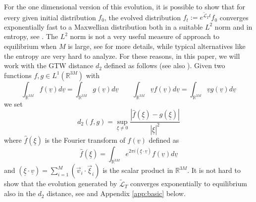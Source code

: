 \documentclass{article}
\newcommand \ul[1]{\underline{#1}}
\renewcommand\v[1]{\vec{#1}}
\newcommand\uxi{{\underline \xi}}
\begin{document}
For the one dimensional version of this evolution, it is possible to show that for every given initial distribution
$f_0$, the evolved distribution $f_t:=e^{\widetilde{\mathcal L}_T t}f_0$ converges exponentially fast to a Maxwellian
distribution both in a suitable $L^2$ norm and in entropy, see \cite{BLV}. The $L^2$ norm is not a very useful measure
of approach to equilibrium when $M$ is large, see \cite{BLV} for more details, while typical alternatives like the
entropy are very hard to analyze. For these reasons, in this paper, we will work with the GTW distance $d_2$ defined as
follows (see also \cite{GTW}). Given two functions $f,g\in L^1(\mathds{R}^{3M})$ with
\[
\int_{\mathds{R}^{3M}} f(\underline v)d\underline v=\int_{\mathds{R}^{3M}} g(\underline v)d\underline v \qquad
\int_{\mathds{R}^{3M}} \underline v f(\underline v)d\underline v= 
\int _{\mathds{R}^{3M}}\underline v g(\underline v)d\underline v
\]
we set
\begin{equation}\label{eq:d2}
 d_2(f,g)=\sup_{\underline \xi\not=0}\frac {|\hat f(\underline \xi)-\hat g(\underline \xi)|}{|\underline \xi|^2}
\end{equation}
where $\hat f(\uxi)$ is the Fourier transform of $f(\underline v)$ defined as
\[
 \hat f(\ul\xi)=\int_{\mathds R^{3M}}e^{2\pi i (\underline\xi \cdot \underline v)}f(\underline v)d\underline v
\]
and $(\underline\xi \cdot \underline v)=\sum_{i=1}^M (\v v_i\cdot\v \xi_i)$ is the scalar product in $\mathds R^{3M}$.
It is not hard to show that the evolution generated by $\widetilde{\mathcal L}_T$ converges exponentially to equilibrium 
also in the
$d_2$ distance, see \cite{CLM,Evans} and Appendix \ref{app:basic} below.
\end{document}
